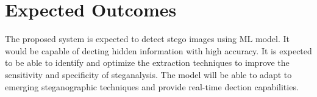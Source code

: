 \chapter{Expected Outcomes}
The proposed system is expected to detect stego images using ML model. It would be capable of decting hidden information with high accuracy. It is expected to be able to identify and optimize the extraction techniques to improve the sensitivity and specificity of steganalysis. The model will be able to adapt to emerging steganographic techniques and provide real-time dection capabilities. 




